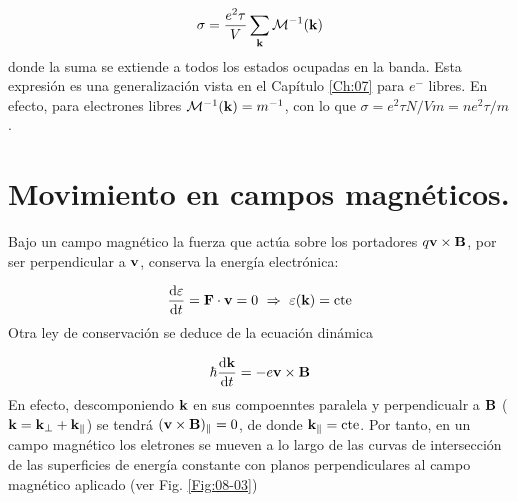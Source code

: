 \begin{equation}
	\sigma = \frac{e^2 \tau}{V} \sum_{\mathbf{k}} \mathcal{M}^{-1} (\mathbf{k})
\end{equation}
donde la suma se extiende a todos los estados ocupadas en la banda. Esta expresión es una generalización vista en el Capítulo \ref{Ch:07} para $e^-$ libres. En efecto, para electrones libres $\mathcal{M}^{-1} (\mathbf{k}) = m^{-1}$, con lo que $\sigma = e^2 \tau N / V m = ne^2 \tau / m$.

\section{Movimiento en campos magnéticos.}

Bajo un campo magnético la fuerza que actúa sobre los portadores $q\mathbf{v} \times \mathbf{B}$, por ser perpendicular a $\mathbf{v}$, conserva la energía electrónica:

\begin{equation}
	\frac{\mathrm{d} \varepsilon}{\mathrm{d} t} = \mathbf{F} \cdot \mathbf{v} = 0 \ \Rightarrow \ \varepsilon(\mathbf{k}) = \text{cte}
\end{equation}
Otra ley de conservación se deduce de la ecuación dinámica 

\begin{equation*}
	\hbar \frac{\mathrm{d} \mathbf{k}}{\mathrm{d} t} = - e \mathbf{v} \times \mathbf{B}
\end{equation*}
En efecto, descomponiendo $\mathbf{k}$ en sus compoenntes paralela y perpendicualr a $\mathbf{B}$ ($\mathbf{k} = \mathbf{k}_\perp + \mathbf{k}_\parallel $) se tendrá $(\mathbf{v} \times \mathbf{B})_\parallel =0$, de donde $\mathbf{k}_\parallel=\text{cte}$. Por tanto, en un campo magnético los eletrones se mueven a lo largo de las curvas de intersección de las superficies de energía constante con planos perpendiculares al campo magnético aplicado (ver Fig. \ref{Fig:08-03})

